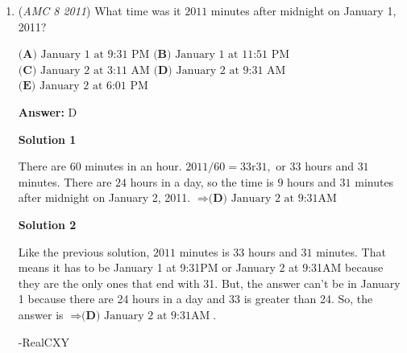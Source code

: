 \begin{enumerate}
 $\textbf{(A) }\text{median} < \text{mean} < \text{mode} \qquad \textbf{(B) }\text{mean} < \text{mode} < \text{median} \\ \\ \textbf{(C) }\text{mean} < \text{median} < \text{mode} \qquad \textbf{(D) }\text{median} < \text{mode} < \text{mean} \\ \\ \textbf{(E) }\text{mode} < \text{median} < \text{mean}$

 \textbf{Answer: }C



\textbf{Solution}

First, put the numbers in increasing order.

 
 \[0,0,1,1,2,2,3,3,3\]

 The mean is $\frac{0+0+1+1+2+2+3+3+3}{9} = \frac{15}{9},$ the median is $2,$ and the mode is $3.$ Because, $\frac{15}{9} < 2 < 3,$ the answer is $\boxed{\textbf{(C)}\ \text{mean} < \text{median} < \text{mode}}$



	\item (\textit{AMC 8 2011}) What time was it $2011$ minutes after midnight on January 1, 2011?


 $\textbf{(A) }\text{January 1 at 9:31 PM}$
$\textbf{(B) }\text{January 1 at 11:51 PM}$
$\textbf{(C) }\text{January 2 at 3:11 AM}$
$\textbf{(D) }\text{January 2 at 9:31 AM}$
$\textbf{(E) }\text{January 2 at 6:01 PM}$

 \textbf{Answer: }D



\textbf{Solution 1}

There are $60$ minutes in an hour. $2011/60=33\text{r}31,$ or $33$ hours and $31$ minutes. There are $24$ hours in a day, so the time is $9$ hours and $31$ minutes after midnight on January 2, 2011. $\Rightarrow\boxed{\textbf{(D)}\text{ January 2 at 9:31AM}}$




\textbf{Solution 2}

Like the previous solution, $2011$ minutes is $33$ hours and $31$ minutes. That means it has to be January 1 at 9:31PM or January 2 at 9:31AM because they are the only ones that end with 31. But, the answer can’t be in January 1 because there are 24 hours in a day and 33 is greater than 24. So, the answer is $\Rightarrow\boxed{\textbf{(D)}\text{ January 2 at 9:31AM}}$.

 -RealCXY

 




\end{enumerate}
